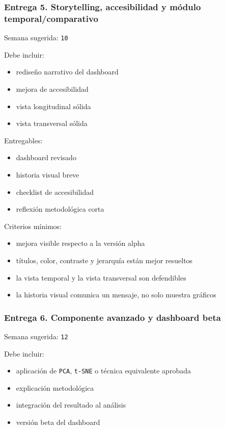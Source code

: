 \documentclass[
]{article}
\providecommand{\tightlist}{%
  \setlength{\itemsep}{0pt}\setlength{\parskip}{0pt}}
\begin{document}
\subsubsection{Entrega 5. Storytelling, accesibilidad y módulo
temporal/comparativo}\label{entrega-5-storytelling-accesibilidad-y-muxf3dulo-temporalcomparativo}

Semana sugerida: \texttt{10}

Debe incluir:

\begin{itemize}
\tightlist
\item
  rediseño narrativo del dashboard
\item
  mejora de accesibilidad
\item
  vista longitudinal sólida
\item
  vista transversal sólida
\end{itemize}

Entregables:

\begin{itemize}
\tightlist
\item
  dashboard revisado
\item
  historia visual breve
\item
  checklist de accesibilidad
\item
  reflexión metodológica corta
\end{itemize}

Criterios mínimos:

\begin{itemize}
\tightlist
\item
  mejora visible respecto a la versión alpha
\item
  títulos, color, contraste y jerarquía están mejor resueltos
\item
  la vista temporal y la vista transversal son defendibles
\item
  la historia visual comunica un mensaje, no solo muestra gráficos
\end{itemize}

\subsubsection{Entrega 6. Componente avanzado y dashboard
beta}\label{entrega-6-componente-avanzado-y-dashboard-beta}

Semana sugerida: \texttt{12}

Debe incluir:

\begin{itemize}
\tightlist
\item
  aplicación de \texttt{PCA}, \texttt{t-SNE} o técnica equivalente
  aprobada
\item
  explicación metodológica
\item
  integración del resultado al análisis
\item
  versión beta del dashboard
\end{itemize}
\end{document}
